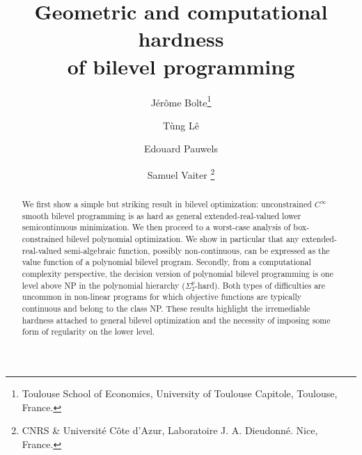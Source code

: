 \documentclass{article}
\title{Geometric and computational hardness\\of  bilevel programming}
\author{Jérôme Bolte\thanks{Toulouse School of Economics, University of Toulouse Capitole, Toulouse, France.} \and Tùng Lê \footnotemark[1] \and Edouard Pauwels\footnotemark[1] \and  Samuel Vaiter \thanks{CNRS \& Université Côte d'Azur, Laboratoire J. A. Dieudonné. Nice, France.} }
\newcommand{\existleveltwo}{\Sigma_2^p}
\newcommand{\TL}[1]{\textcolor{red}{#1}}
\newcommand{\jer}[1]{[[\textcolor{magenta}{#1}]]}
\theoremstyle{plain}
\theoremstyle{definition}
\begin{document}
\maketitle
\begin{abstract}
    We first show a simple but striking result in bilevel optimization: unconstrained $C^\infty$ smooth bilevel programming is as hard as general extended-real-valued lower semicontinuous minimization.
    We then proceed to a worst-case analysis of box-constrained bilevel polynomial optimization.  We show in particular that any extended-real-valued semi-algebraic function, possibly non-continuous, can be expressed as the value function of a polynomial bilevel program. Secondly, from a computational complexity perspective, the decision version of polynomial bilevel programming is one level above NP in the polynomial hierarchy ($\existleveltwo$-hard). Both types of difficulties are uncommon in non-linear programs for which objective functions are typically continuous and belong to the class NP. These results highlight the irremediable hardness attached to general bilevel optimization and the necessity of imposing some form of regularity on the lower level.
\end{abstract}
\end{document}
